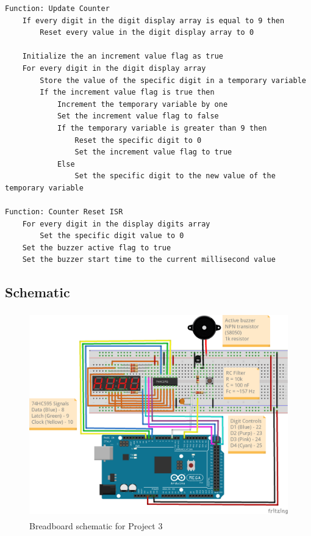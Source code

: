 \begin{lstlisting}[linewidth=1.5\textwidth]
Function: Update Counter
    If every digit in the digit display array is equal to 9 then
        Reset every value in the digit display array to 0
        
    Initialize the an increment value flag as true
    For every digit in the digit display array
        Store the value of the specific digit in a temporary variable
        If the increment value flag is true then
            Increment the temporary variable by one
            Set the increment value flag to false
            If the temporary variable is greater than 9 then
                Reset the specific digit to 0
                Set the increment value flag to true
            Else
                Set the specific digit to the new value of the temporary variable

Function: Counter Reset ISR
    For every digit in the display digits array
        Set the specific digit value to 0
    Set the buzzer active flag to true
    Set the buzzer start time to the current millisecond value
    \end{lstlisting}

    \subsection*{Schematic}
    \begin{figure}[ht!]
        \caption{Breadboard schematic for Project 3}
        \includegraphics[height=3.5in]{../.secret/project_3_7seg_counter/p3_7seg_counter_ugrad_bb.png}
    \end{figure}

\pagebreak


